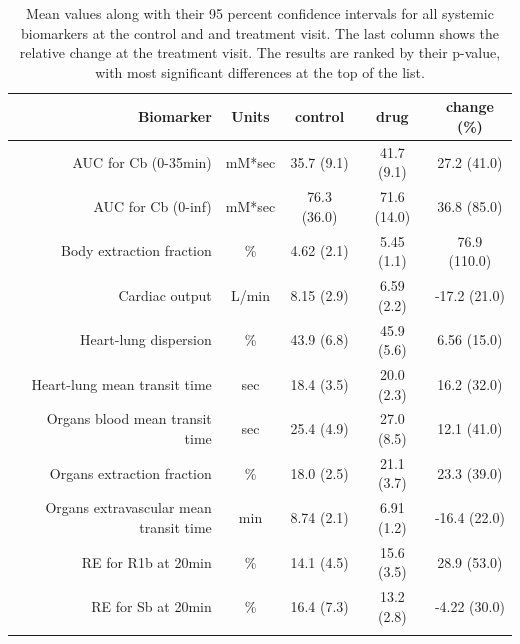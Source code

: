 \documentclass{epflreport}%
\begin{document}
\begin{longtable}{rcccc}%
\hline%
Biomarker&Units&control&drug&change (\%)\\%
\hline%
AUC for Cb (0{-}35min)&mM*sec&35.7 (9.1) &41.7 (9.1) &27.2 (41.0) \\%
AUC for Cb (0{-}inf)&mM*sec&76.3 (36.0) &71.6 (14.0) &36.8 (85.0) \\%
Body extraction fraction&\%&4.62 (2.1) &5.45 (1.1) &76.9 (110.0) \\%
Cardiac output&L/min&8.15 (2.9) &6.59 (2.2) &{-}17.2 (21.0) \\%
Heart{-}lung dispersion&\%&43.9 (6.8) &45.9 (5.6) &6.56 (15.0) \\%
Heart{-}lung mean transit time&sec&18.4 (3.5) &20.0 (2.3) &16.2 (32.0) \\%
Organs blood mean transit time&sec&25.4 (4.9) &27.0 (8.5) &12.1 (41.0) \\%
Organs extraction fraction&\%&18.0 (2.5) &21.1 (3.7) &23.3 (39.0) \\%
Organs extravascular mean transit time&min&8.74 (2.1) &6.91 (1.2) &{-}16.4 (22.0) \\%
RE for R1b at 20min&\%&14.1 (4.5) &15.6 (3.5) &28.9 (53.0) \\%
RE for Sb at 20min&\%&16.4 (7.3) &13.2 (2.8) &{-}4.22 (30.0) \\%
\hline%
\caption{Mean values along with their 95 percent confidence intervals for all systemic biomarkers at the control and and treatment visit. The last column shows the relative change at the treatment visit. The results are ranked by their p-value, with most significant differences at the top of the list.} \\%
\end{longtable}%
\end{document}
